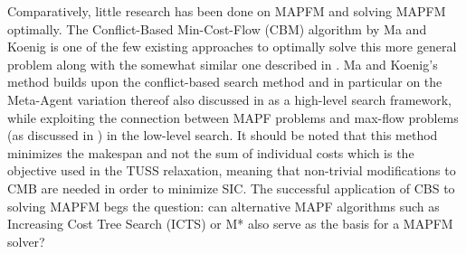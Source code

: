 \documentclass[english]{article}
\begin{document}
	Comparatively, little research has been done on MAPFM and solving MAPFM optimally.
	The Conflict-Based Min-Cost-Flow (CBM) algorithm by Ma and Koenig \cite{ma2016} is one of the few existing approaches to optimally solve this more general problem along with the somewhat similar one described in \cite{henkel2019}.
	Ma and Koenig's method builds upon the conflict-based search method and in particular on the Meta-Agent variation thereof also discussed in \cite{sharon2015} as a high-level search framework, while exploiting the connection between MAPF problems and max-flow problems (as discussed in \cite{yu2013}) in the low-level search. It should be noted that this method minimizes the makespan and not the sum of individual costs which is the objective used in the TUSS relaxation, meaning that non-trivial modifications to CMB are needed in order to minimize SIC.
	The successful application of CBS to solving MAPFM begs the question: can alternative MAPF algorithms such as Increasing Cost Tree Search (ICTS) \cite{sharon2011} or M* \cite{wagner2011} also serve as the basis for a MAPFM solver?
		
\end{document}
